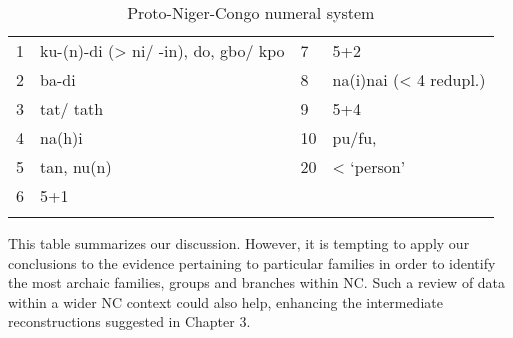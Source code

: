\begin{table}
\caption{\label{tab:4:41}Proto-Niger-Congo numeral system}


\begin{tabularx}{\textwidth}{XlXl}
\lsptoprule

1 & ku-(n)-di (> ni/ -in), do, gbo/ kpo & 7 & 5+2\\
2 & ba-di & 8 & na(i)nai (< 4 redupl.)\\
3 & tat/ tath & 9 & 5+4\\
4 & na(h)i & 10 & pu/fu, \\
5 & tan, nu(n) & 20 & < ‘person’\\
6 & 5+1 &  & \\
\lspbottomrule
\end{tabularx}
\end{table}
This table summarizes our discussion. However, it is tempting to apply our conclusions to the evidence pertaining to particular families in order to identify the most archaic families, groups and branches within NC. Such a review of data within a wider NC context could also help, enhancing the intermediate reconstructions suggested in Chapter 3.
